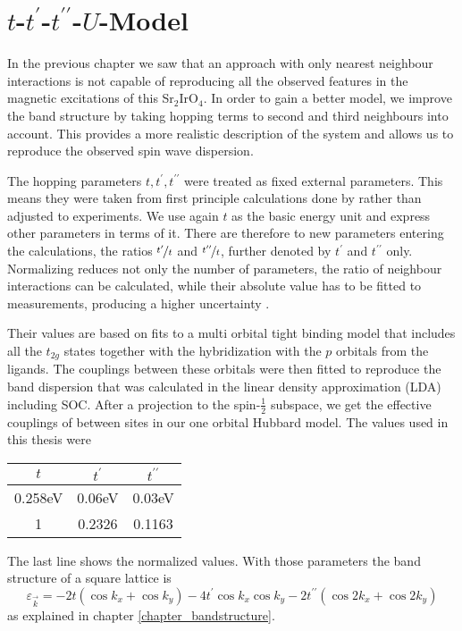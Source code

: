 \section{$t$-$t^{\prime}$-$t^{\prime \prime}$-$U$-Model}

In the previous chapter we saw that an approach with only nearest neighbour interactions  is not capable of reproducing all the observed features 
in the magnetic excitations of this Sr$_2$IrO$_4$.
In order to gain a better model, we improve the band structure by taking hopping terms to second and third neighbours into account. 
This provides a more realistic description of the system and allows us to reproduce the observed spin wave dispersion.



The hopping parameters $t,t^{\prime},t^{\prime \prime}$ were treated as fixed external parameters.
This means they were taken from first principle calculations done by 
\citet{PhysRevLett.106.136402} rather than adjusted to experiments.
We use again $t$ as the basic  energy unit and express other parameters in terms of it.
There are therefore to new parameters entering the calculations, the ratios $\nicefrac{t^{\prime}}{t}$ and $\nicefrac{t^{\prime \prime}}{t}$, further denoted by $t^{\prime}$ and 
$t^{\prime \prime}$ only. 
Normalizing reduces not only the number of parameters, the ratio of neighbour interactions can be calculated, while 
their absolute value has to be fitted to measurements, producing a higher uncertainty \cite{PhysRevB.67.064504}.

Their values are based on fits to a multi orbital tight binding model that includes all the $t_{2g}$ states together with the hybridization with the $p$ orbitals from the 
ligands.
The couplings between these orbitals were then fitted to reproduce the band dispersion that was calculated in the linear density approximation (LDA) including SOC. 
After a projection to the spin-$\frac12$ subspace, we get the effective couplings of between sites in our one orbital Hubbard model.
The values used in this thesis were 
%
\begin{center}
\begin{tabular}{|c|c|c|}
\hline
$t$ & $t^{\prime}$ & $t^{\prime \prime}$ \\
\hline
0.258eV & 0.06eV & 0.03eV \\
1 & 0.2326 & 0.1163 \\
\hline
\end{tabular}
\end{center} 
%
The last line shows the normalized values.
With those parameters the band structure of a square lattice is 
\begin{equation}
  \varepsilon_{\vec k } = -2t \left(\cos k_x + \cos k_y \right) -4t^{\prime} \cos k_x \cos k_y  -2t^{\prime \prime} \left( \cos 2k_x + \cos 2k_y \right)
\end{equation}
as explained in chapter \ref{chapter_bandstructure}.



